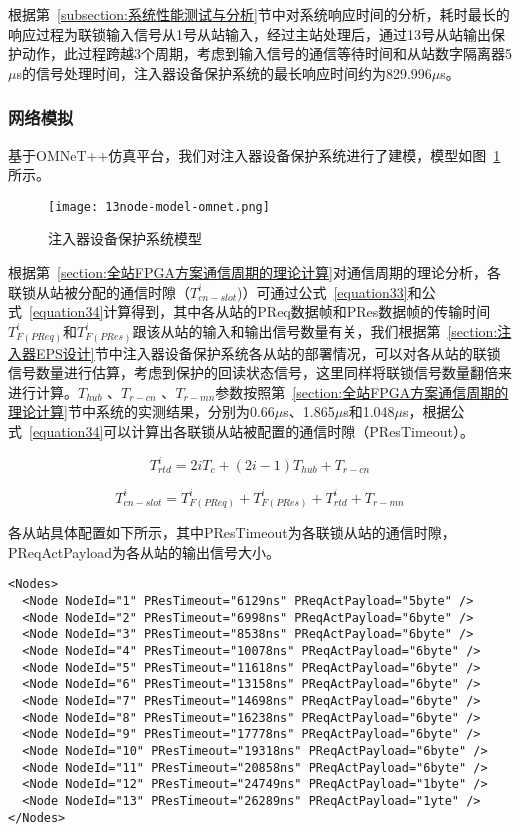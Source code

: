 根据第~\ref{subsection:系统性能测试与分析}节中对系统响应时间的分析，耗时最长的响应过程为联锁输入信号从1号从站输入，经过主站处理后，通过13号从站输出保护动作，此过程跨越3个周期，考虑到输入信号的通信等待时间和从站数字隔离器5$\mu$s的信号处理时间，注入器设备保护系统的最长响应时间约为829.996$\mu$s。


\subsubsection{网络模拟}

基于OMNeT++仿真平台，我们对注入器设备保护系统进行了建模，模型如图~\ref{fig:13node-model-omnet}所示。

\begin{figure}[!htb]
  \centering
  \texttt{[image: 13node-model-omnet.png]}
  \caption{注入器设备保护系统模型}
  \label{fig:13node-model-omnet}
\end{figure}

根据第~\ref{section:全站FPGA方案通信周期的理论计算}对通信周期的理论分析，各联锁从站被分配的通信时隙（$T_{cn-slot}^{i}$)）可通过公式~\ref{equation33}和公式~\ref{equation34}计算得到，其中各从站的PReq数据帧和PRes数据帧的传输时间$T_{F(PReq)}^{i}$和$T_{F(PRes)}^{i}$跟该从站的输入和输出信号数量有关，我们根据第~\ref{section:注入器EPS设计}节中注入器设备保护系统各从站的部署情况，可以对各从站的联锁信号数量进行估算，考虑到保护的回读状态信号，这里同样将联锁信号数量翻倍来进行计算。$T_{hub}$ 、$T_{r-cn}$ 、$T_{r-mn}$参数按照第~\ref{section:全站FPGA方案通信周期的理论计算}节中系统的实测结果，分别为0.66$\mu$s、1.865$\mu$s和1.048$\mu$s，根据公式~\ref{equation34}可以计算出各联锁从站被配置的通信时隙（PResTimeout）。

\begin{equation}
\label{equation33}
T_{rtd}^{i}=2iT_{c}+(2i-1)T_{hub}+T_{r-cn}
\end{equation}

\begin{equation}
\label{equation34}
T_{cn-slot}^{i}=T_{F(PReq)}^{i}+T_{F(PRes)}^{i}+T_{rtd}^{i}+T_{r-mn}
\end{equation}

各从站具体配置如下所示，其中PResTimeout为各联锁从站的通信时隙，PReqActPayload为各从站的输出信号大小。

\begin{lstlisting}
<Nodes>
  <Node NodeId="1" PResTimeout="6129ns" PReqActPayload="5byte" />
  <Node NodeId="2" PResTimeout="6998ns" PReqActPayload="6byte" />
  <Node NodeId="3" PResTimeout="8538ns" PReqActPayload="6byte" />
  <Node NodeId="4" PResTimeout="10078ns" PReqActPayload="6byte" />
  <Node NodeId="5" PResTimeout="11618ns" PReqActPayload="6byte" />
  <Node NodeId="6" PResTimeout="13158ns" PReqActPayload="6byte" />
  <Node NodeId="7" PResTimeout="14698ns" PReqActPayload="6byte" />
  <Node NodeId="8" PResTimeout="16238ns" PReqActPayload="6byte" />
  <Node NodeId="9" PResTimeout="17778ns" PReqActPayload="6byte" />
  <Node NodeId="10" PResTimeout="19318ns" PReqActPayload="6byte" />
  <Node NodeId="11" PResTimeout="20858ns" PReqActPayload="6byte" />
  <Node NodeId="12" PResTimeout="24749ns" PReqActPayload="1byte" />
  <Node NodeId="13" PResTimeout="26289ns" PReqActPayload="1yte" />
</Nodes>
\end{lstlisting}

